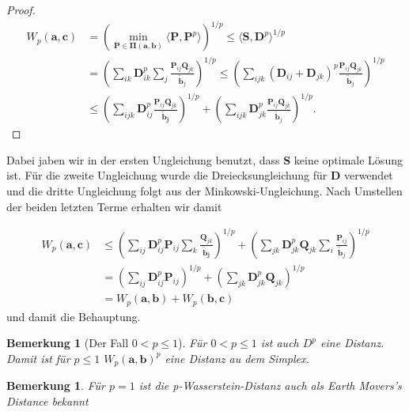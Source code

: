 \documentclass[11pt,a4paper]{article}
\newtheorem{remark}[theorem]{Bemerkung}
\numberwithin{equation}{section}
\begin{document}
\begin{proof}
		\begin{align}
		W_p(\boldsymbol{a},\boldsymbol{c}) &=\left(\min_{\boldsymbol{P \in \boldsymbol{\Pi}(\boldsymbol{a},\boldsymbol{b})}}{\langle \boldsymbol{P},\boldsymbol{P}^p \rangle}\right)^{1/p} \leq \langle \boldsymbol{S}, \boldsymbol{D}^p \rangle ^{1/p} \\
		&= \left( \sum_{ik}{\boldsymbol{D}_{ik}^p} \sum_j{\frac{\boldsymbol{P}_{ij}\boldsymbol{Q}_{jk}}{\tilde{\boldsymbol{b}}_j}}\right)^{1/p} \leq \left(\sum_{ijk}{(\boldsymbol{D}_{ij} + \boldsymbol{D}_{jk})^p \frac{\boldsymbol{P}_{ij}\boldsymbol{Q}_{jk}}{\tilde{\boldsymbol{b}}_j}}\right)^{1/p}\\
		&\leq \left(\sum_{ijk}{\boldsymbol{D}_{ij}^p}\frac{\boldsymbol{P}_{ij}\boldsymbol{Q}_{jk}}{\boldsymbol{\tilde{\boldsymbol{b}}_j}}\right)^{1/p} + \left(\sum_{ijk}{\boldsymbol{D}_{jk}^p \frac{\boldsymbol{P}_{ij}\boldsymbol{Q}_{jk}}{\tilde{\boldsymbol{b}}_j}}\right)^{1/p}.	 	\end{align}
	\end{proof}
	Dabei jaben wir in der ersten Ungleichung benutzt, dass $\boldsymbol{S}$ keine optimale Lösung ist. Für die zweite Ungleichung wurde die Dreiecksungleichung für $\boldsymbol{D}$ verwendet und die dritte Ungleichung folgt aus der Minkowski-Ungleichung.
	Nach Umstellen der beiden letzten Terme erhalten wir damit
	
	\begin{align*}
	W_p(\boldsymbol{a},\boldsymbol{c}) 
	&\leq \left(\sum_{ij}{\boldsymbol{D}_{ij}^p\boldsymbol{P}_{ij}}\sum_k{\frac{\boldsymbol{Q}_{jk}}{\boldsymbol{\tilde{\boldsymbol{b}}_j}}}\right)^{1/p} + \left(\sum_{jk}{\boldsymbol{D}_{jk}^p\boldsymbol{Q}_{jk}}\sum_i{ \frac{\boldsymbol{P}_{ij}}{\tilde{\boldsymbol{b}}_j}}\right)^{1/p}\\
	&= \left(\sum_{ij}{\boldsymbol{D}_{ij}^p\boldsymbol{P}_{ij}}\right)^{1/p}
	+
	\left(\sum_{jk}{\boldsymbol{D}_{jk}^p\boldsymbol{Q}_{jk}}\right)^{1/p}\\
	&= W_p(\boldsymbol{a},\boldsymbol{b})
	+ W_p(\boldsymbol{b},\boldsymbol{c})  
	\end{align*}
	und damit die Behauptung.
	\begin{remark}[Der Fall $0 < p \leq 1$]
		Für $0 < p \leq 1$ ist auch $D^p$ eine Distanz. Damit ist für $ p \leq 1$ $W_p(\boldsymbol{a}, \boldsymbol{b})^p$ eine Distanz au dem Simplex.
		
	\end{remark}
	
	\begin{remark}
		Für $p=1$ ist die p-Wasserstein-Distanz auch als Earth Movers's Distance \cite{rubner2000earth} bekannt
	\end{remark}
	
\end{document}
